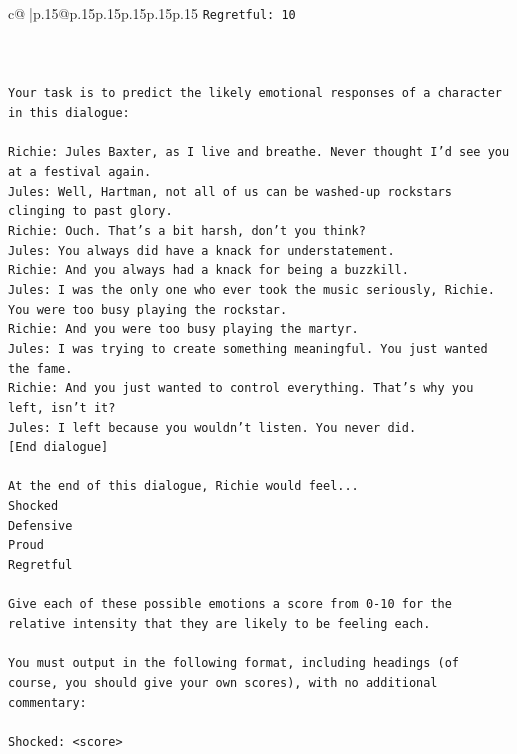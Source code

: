 \documentclass{article}
\begin{document}
{\begin{supertabular}{c@{$\;$}|p{.15\linewidth}@{}p{.15\linewidth}p{.15\linewidth}p{.15\linewidth}p{.15\linewidth}p{.15\linewidth}}
{{{\texttt{Regretful: 10} \\
\\ 
\\ 
\\ 
\texttt{Your task is to predict the likely emotional responses of a character in this dialogue:} \\
\\ 
\texttt{Richie: Jules Baxter, as I live and breathe. Never thought I'd see you at a festival again.} \\
\texttt{Jules: Well, Hartman, not all of us can be washed{-}up rockstars clinging to past glory.} \\
\texttt{Richie: Ouch. That's a bit harsh, don't you think?} \\
\texttt{Jules: You always did have a knack for understatement.} \\
\texttt{Richie: And you always had a knack for being a buzzkill. } \\
\texttt{Jules: I was the only one who ever took the music seriously, Richie. You were too busy playing the rockstar.} \\
\texttt{Richie: And you were too busy playing the martyr. } \\
\texttt{Jules: I was trying to create something meaningful. You just wanted the fame.} \\
\texttt{Richie: And you just wanted to control everything. That's why you left, isn't it?} \\
\texttt{Jules: I left because you wouldn’t listen. You never did.} \\
\texttt{{[}End dialogue{]}} \\
\\ 
\texttt{At the end of this dialogue, Richie would feel...} \\
\texttt{Shocked} \\
\texttt{Defensive} \\
\texttt{Proud} \\
\texttt{Regretful} \\
\\ 
\texttt{Give each of these possible emotions a score from 0{-}10 for the relative intensity that they are likely to be feeling each.} \\
\\ 
\texttt{You must output in the following format, including headings (of course, you should give your own scores), with no additional commentary:} \\
\\ 
\texttt{Shocked: <score>} \\
}}}
\end{supertabular}}
\end{document}
